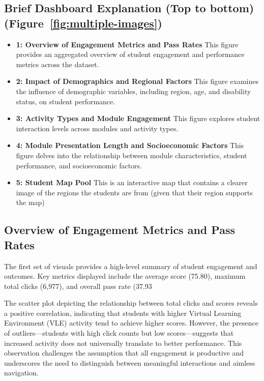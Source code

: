 \subsection*{Brief Dashboard Explanation (Top to bottom) (Figure~\ref{fig:multiple-images})}
\begin{itemize}
    \item \textbf{1: Overview of Engagement Metrics and Pass Rates} This figure provides an aggregated overview of student engagement and performance metrics across the dataset.
    
    \item \textbf{2: Impact of Demographics and Regional Factors} This figure examines the influence of demographic variables, including region, age, and disability status, on student performance.

    \item \textbf{3: Activity Types and Module Engagement} This figure explores student interaction levels across modules and activity types.

    \item \textbf{4: Module Presentation Length and Socioeconomic Factors} This figure delves into the relationship between module characteristics, student performance, and socioeconomic factors.

    \item \textbf{5: Student Map Pool} This is an interactive map that contains a clearer image of the regions the students are from (given that their region supports the map)

\end{itemize}

\subsection*{Overview of Engagement Metrics and Pass Rates}

The first set of visuals provides a high-level summary of student engagement and outcomes. Key metrics displayed include the average score (75.80), maximum total clicks (6,977), and overall pass rate (37.93%

The scatter plot depicting the relationship between total clicks and scores reveals a positive correlation, indicating that students with higher Virtual Learning Environment (VLE) activity tend to achieve higher scores. However, the presence of outliers—students with high click counts but low scores—suggests that increased activity does not universally translate to better performance. This observation challenges the assumption that all engagement is productive and underscores the need to distinguish between meaningful interactions and aimless navigation.


